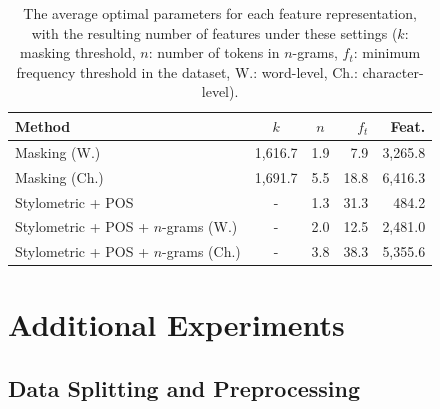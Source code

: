\documentclass[11pt]{article}
\begin{document}
\begin{table}[htbp]
\centering
\begin{tabular}{l|ccrr}
\hline
\textbf{Method}   & \textbf{$k$} & \textbf{$n$} & \textbf{$f_{t}$} & Feat. \\
\hline
Masking (W.)                  & 1,616.7  & 1.9 & 7.9 & 3,265.8 \\ 
Masking (Ch.)                 & 1,691.7  & 5.5 & 18.8 & 6,416.3 \\ 
Stylometric + POS                      & -        & 1.3 & 31.3 & 484.2 \\ 
Stylometric + POS + $n$-grams (W.)  & -    & 2.0 & 12.5 & 2,481.0\\ 
Stylometric + POS + $n$-grams (Ch.) &   -      & 3.8 & 38.3 & 5,355.6\\ 
\hline
\end{tabular}
\caption{\label{optimalTable}
The average optimal parameters for each feature representation, with the resulting number of features under these settings ($k$: masking threshold, $n$: number of tokens in $n$-grams, \textit{$f_{t}$}: minimum frequency threshold in the dataset, W.: word-level, Ch.: character-level).}
\end{table}




\section{Additional Experiments\label{additional}}
\subsection{Data Splitting and Preprocessing\label{sec:prepro}}
\end{document}
